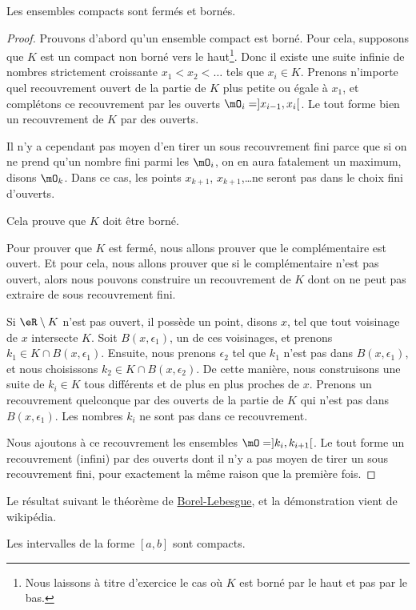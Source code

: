 \begin{proposition}
Les ensembles compacts sont fermés et bornés.
\end{proposition}

\begin{proof}
Prouvons d'abord qu'un ensemble compact est borné. Pour cela, supposons que $K$ est un compact non borné vers le haut\footnote{Nous laissons à titre d'exercice le cas où $K$ est borné par le haut et pas par le bas.}. Donc il existe une suite infinie de nombres strictement croissante $x_1<x_2<\ldots$ tels que $x_i\in K$. Prenons n'importe quel recouvrement ouvert de la partie de $K$ plus petite ou égale à $x_1$, et complétons ce recouvrement par les ouverts $\mO_i=]x_{i-1},x_i[$. Le tout forme bien un recouvrement de $K$ par des ouverts.

Il n'y a cependant pas moyen d'en tirer un sous recouvrement fini parce que si on ne prend qu'un nombre fini parmi les $\mO_i$, on en aura fatalement un maximum, disons $\mO_k$. Dans ce cas, les points $x_{k+1}$, $x_{k+1}$,\ldots ne seront pas dans le choix fini d'ouverts.

Cela prouve que $K$ doit être borné.

Pour prouver que $K$ est fermé, nous allons prouver que le complémentaire est ouvert. Et pour cela, nous allons prouver que si le complémentaire n'est pas ouvert, alors nous pouvons construire un recouvrement de $K$ dont on ne peut pas extraire de sous recouvrement fini.

Si $\eR\setminus K$ n'est pas ouvert, il possède un point, disons $x$, tel que tout voisinage de $x$ intersecte $K$. Soit $B(x,\epsilon_1)$, un de ces voisinages, et prenons $k_1\in K\cap B(x,\epsilon_1)$. Ensuite, nous prenons $\epsilon_2$ tel que $k_1$ n'est pas dans $B(x,\epsilon_1)$, et nous choisissons $k_2\in K\cap B(x,\epsilon_2)$. De cette manière, nous construisons une suite de $k_i\in K$ tous différents et de plus en plus proches de $x$. Prenons un recouvrement quelconque par des ouverts de la partie de $K$ qui n'est pas dans $B(x,\epsilon_1)$. Les nombres $k_i$ ne sont pas dans ce recouvrement.

Nous ajoutons à ce recouvrement les ensembles $\mO=]k_i,k_{i+1}[$. Le tout forme un recouvrement (infini) par des ouverts dont il n'y a pas moyen de tirer un sous recouvrement fini, pour exactement la même raison que la première fois.
\end{proof}

Le résultat suivant le théorème de \href{http://fr.wikipedia.org/wiki/Théorème_de_Heine-Borel}{Borel-Lebesgue}, et la démonstration vient de wikipédia.
\begin{theorem}   \label{ThoBOrelLebesgue}
    Les intervalles de la forme $[a,b]$ sont compacts.
\end{theorem}

